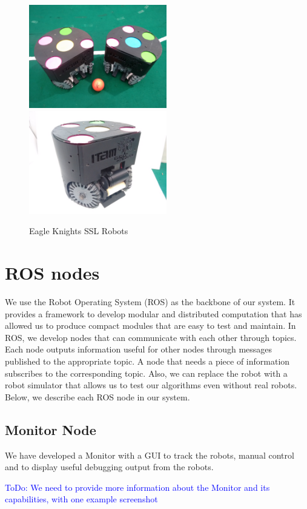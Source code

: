 \documentclass[]{llncs}
\newcommand{\TODO}[1]{{\textcolor{blue}{ToDo: {#1}}}}
\begin{document}
\begin{figure}[htb]
	\centering
	\includegraphics[width=6cm]{./pictures/two_ekbots.jpg}
	\includegraphics[width=6cm]{./pictures/ekbot_front.jpg}
	\caption{Eagle Knights SSL Robots}
	\label{fig:two-ekbots}  
\end{figure}


\section{ROS nodes}

We use the Robot Operating System (ROS) as the backbone of our system. It provides a framework to develop modular and distributed computation that has allowed us to produce compact modules that are easy to test and maintain. In ROS, we develop nodes that can communicate with each other through topics. Each node outputs information useful for other nodes through messages published to the appropriate topic. A node that needs a piece of information subscribes to the corresponding topic. Also, we can replace the robot with a robot simulator that allows us to test our algorithms even without real robots. Below, we describe each ROS node in our system.

\subsection{Monitor Node}
We have developed a Monitor with a GUI to track the robots, manual control and to display useful debugging output from the robots. 

\TODO{We need to provide more information about the Monitor and its capabilities, with one example screenshot}
\end{document}
